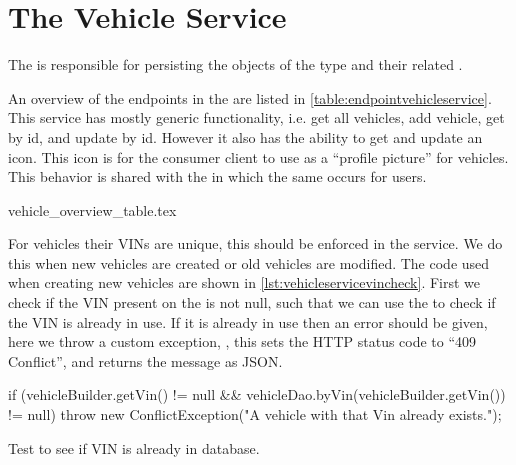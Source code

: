 \section{The Vehicle Service}\label{subsec:vehicleservice}

The  is responsible for persisting the objects of the type  and their related .

An overview of the endpoints in the  are listed in \cref{table:endpointvehicleservice}.
This service has mostly generic functionality, i.e. get all vehicles, add vehicle, get by id, and update by id.
However it also has the ability to get and update an icon.
This icon is for the consumer client to use as a ``profile picture'' for vehicles.
This behavior is shared with the  in which the same occurs for users.

{vehicle_overview_table.tex}

For vehicles their \acp{VIN} are unique, this should be enforced in the service.
We do this when new vehicles are created or old vehicles are modified.
The code used when creating new vehicles are shown in \cref{lst:vehicleservicevincheck}.
First we check if the \ac{VIN} present on the  is not null,
such that we can use the  to check if the \ac{VIN} is already in use.
If it is already in use then an error should be given, here we throw a custom exception,
, this sets the HTTP status code to ``409 Conflict'', and returns the message as JSON.

\begin{listing}
    \begin{java2}
if (vehicleBuilder.getVin() != null && vehicleDao.byVin(vehicleBuilder.getVin()) != null) {
    throw new ConflictException("A vehicle with that Vin already exists.");
}
    \end{java2}
    \caption{Test to see if VIN is already in database.}\label{lst:vehicleservicevincheck}
\end{listing}
